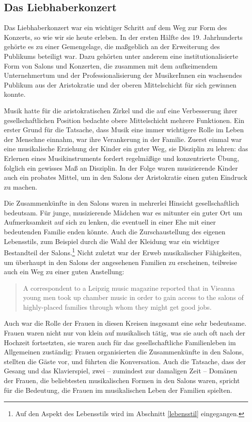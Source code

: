 \documentclass[a4paper, german, oneside]{scrbook}
\begin{document}
\subsection{Das Liebhaberkonzert}
\label{liebhaber}
Das Liebhaberkonzert war ein wichtiger Schritt auf dem Weg zur Form des Konzerts, so wie wir sie heute erleben. In der ersten Hälfte des 19. Jahrhunderts gehörte es zu einer Gemengelage, die maßgeblich an der Erweiterung des Publikums beteiligt war. Dazu gehörten unter anderem eine institutionalisierte Form von Salons und Konzerten, die zusammen mit dem aufkeimendem Unternehmertum und der Professionalisierung der MusikerInnen ein wachsendes Publikum aus der Aristokratie und der oberen Mittelschicht für sich gewinnen konnte.

Musik hatte für die aristokratischen Zirkel und die auf eine Verbesserung ihrer gesellschaftlichen Position bedachte obere Mittelschicht mehrere Funktionen. Ein erster Grund für die Tatsache, dass Musik eine immer wichtigere Rolle im Leben der Menschne einnahm, war ihre Verankerung in der Familie. Zuerst einmal war eine musikalische Erziehung der Kinder ein guter Weg, sie Disziplin zu lehren: das Erlernen eines Musikinstruments fordert regelmäßige und konzentrierte Übung, folglich ein gewisses Maß an Disziplin. \parencite[35ff.]{weber_music_2004} In der Folge waren musizierende Kinder auch ein probates Mittel, um in den Salons der Aristokratie einen guten Eindruck zu machen.

Die Zusammenkünfte in den Salons waren in mehrerlei Hinsicht gesellschaftlich bedeutsam. Für junge, musizierende Mädchen war es mitunter ein guter Ort um Aufmerksamkeit auf sich zu lenken, die eventuell in einer Ehe mit einer bedeutenden Familie enden könnte. Auch die Zurschaustellung des eigenen Lebensstils, zum Beispiel durch die Wahl der Kleidung war ein wichtiger Bestandteil der Salons.\footnote{Auf den Aspekt des Lebensstils wird im Abschnitt \ref{lebensstil} eingegangen.} Nicht zuletzt war der Erweb musikalischer Fähigkeiten, um überhaupt in den Salons der angesehenen Familien zu erscheinen, teilweise auch ein Weg zu einer guten Anstellung: \blockquote[{\cite[vgl.][37]{weber_music_2004}}]{A correspondent to a Leipzig music magazine reported that in Vieanna young men took up chamber music in order to gain access to the salons of highly-placed families through whom they might get good jobs.}

Auch war die Rolle der Frauen in diesen Kreisen insgesamt eine sehr bedeutsame. Frauen waren nicht nur von klein auf musikalisch tätig, was sie auch oft nach der Hochzeit fortsetzten, sie waren auch für das gesellschaftliche Familienleben im Allgemeinen zuständig: Frauen organisierten die Zusammenkünfte in den Salons, stellten die Gäste vor, und führten die Konversation. Auch die Tatsache, dass der Gesang und das Klavierspiel, zwei -- zumindest zur damaligen Zeit -- Domänen der Frauen, die beliebtesten musikalischen Formen in den Salons waren, spricht für die Bedeutung, die Frauen im musikalischen Leben der Familien spielten. \parencite[vgl.][41]{weber_music_2004}
\end{document}

